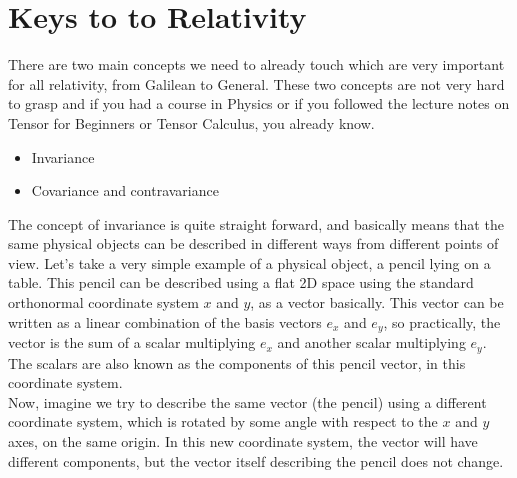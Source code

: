 \section{Keys to to Relativity}

There are two main concepts we need to already touch which are very important for all relativity, from Galilean to General.
These two concepts are not very hard to grasp and if you had a course in Physics or if you followed the lecture notes on Tensor for Beginners 
or Tensor Calculus, you already know.\\

\begin{itemize}
    \item Invariance
    \item Covariance and contravariance
\end{itemize}

The concept of invariance is quite straight forward, and basically means that the same physical objects can be described 
in different ways from different points of view.
Let's take a very simple example of a physical object, a pencil lying on a table.
This pencil can be described using a flat 2D space using the standard orthonormal coordinate system $x$ and $y$, as a vector basically.
This vector can be written as a linear combination of the basis vectors $e_x$ and $e_y$, so practically, the vector
is the sum of a scalar multiplying $e_x$ and another scalar multiplying $e_y$. The scalars are also known as the components  
of this pencil vector, in this coordinate system.\\

Now, imagine we try to describe the same vector (the pencil) using a different coordinate system, which is rotated by some angle with respect to the 
$x$ and $y$ axes, on the same origin.
In this new coordinate system, the vector will have different components, but the vector itself describing the pencil does not change.\\

